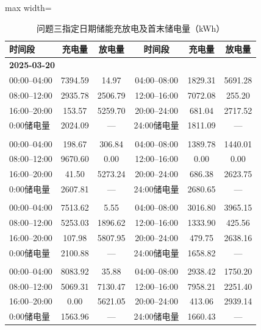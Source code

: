 \documentclass[UTF8,a4paper,zihao=-4,fontset=windows]{ctexart}
\newcommand{\figtabnote}[1]{\par\vspace{3pt}{\fontsize{9}{11}\selectfont\raggedright\noindent 注：#1\par}}
\begin{document}
\begin{table}[H]\centering
\fontsize{9.5}{12}\selectfont\setlength{\tabcolsep}{4pt}\renewcommand{\arraystretch}{1.12}
\begin{adjustbox}{max width=\linewidth}\begin{tabular}{lccccc}\toprule
\textbf{时间段} & \textbf{充电量} & \textbf{放电量} & \textbf{时间段} & \textbf{充电量} & \textbf{放电量}\\
\midrule
\multicolumn{6}{l}{\textbf{2025-03-20}}\\[1pt]
00:00–04:00 & 7394.59 & 14.97 & 04:00–08:00 & 1829.31 & 5691.28\\
08:00–12:00 & 2935.78 & 2506.79 & 12:00–16:00 & 7072.08 & 255.20\\
16:00–20:00 & 153.57 & 5259.70 & 20:00–24:00 & 681.04 & 2717.52\\
0:00储电量 & 2024.09 & — & 24:00储电量 & 1811.09 & —\\
\addlinespace[4pt]
\multicolumn{6}{l}{\textbf{2025-06-21}}\\[1pt]
00:00–04:00 & 198.67 & 306.84 & 04:00–08:00 & 1389.78 & 1440.01\\
08:00–12:00 & 9670.60 & 0.00 & 12:00–16:00 & 0.00 & 0.00\\
16:00–20:00 & 41.50 & 5273.24 & 20:00–24:00 & 686.38 & 2623.75\\
0:00储电量 & 2607.81 & — & 24:00储电量 & 2680.65 & —\\
\addlinespace[4pt]
\multicolumn{6}{l}{\textbf{2025-09-23}}\\[1pt]
00:00–04:00 & 7513.62 & 5.55 & 04:00–08:00 & 3016.80 & 3965.15\\
08:00–12:00 & 5253.03 & 1896.62 & 12:00–16:00 & 1333.90 & 425.56\\
16:00–20:00 & 107.98 & 5807.95 & 20:00–24:00 & 479.75 & 2638.16\\
0:00储电量 & 2100.88 & — & 24:00储电量 & 1658.82 & —\\
\addlinespace[4pt]
\multicolumn{6}{l}{\textbf{2025-12-21}}\\[1pt]
00:00–04:00 & 8083.92 & 35.88 & 04:00–08:00 & 2938.42 & 1750.20\\
08:00–12:00 & 5069.31 & 7130.47 & 12:00–16:00 & 7958.21 & 2251.40\\
16:00–20:00 & 0.00 & 5621.05 & 20:00–24:00 & 413.06 & 2939.14\\
0:00储电量 & 1563.96 & — & 24:00储电量 & 1660.43 & —\\
\bottomrule\end{tabular}\end{adjustbox}
\caption{问题三指定日期储能充放电及首末储电量（kWh）}
\figtabnote{表中为最终实际运行结果。}
\end{table}
\end{document}
